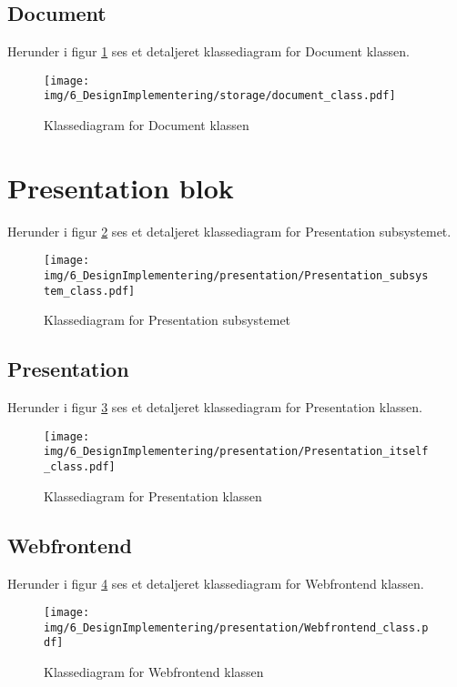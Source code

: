 \begin{appendices}
\pagebreak
\subsection{Document}
Herunder i figur \ref{fig:Document_class} ses et detaljeret klassediagram for Document klassen.
\begin{figure}[H]
	\centering
	\texttt{[image: img/6\_DesignImplementering/storage/document\_class.pdf]}
	\caption{Klassediagram for Document klassen}
	\label{fig:Document_class}
\end{figure}

\pagebreak
\section{Presentation blok}

Herunder i figur \ref{fig:Presentation_block} ses et detaljeret klassediagram for Presentation subsystemet.
\begin{figure}[H]
	\centering
	\texttt{[image: img/6\_DesignImplementering/presentation/Presentation\_subsystem\_class.pdf]}
	\caption{Klassediagram for Presentation subsystemet}
	\label{fig:Presentation_block}
\end{figure}
\pagebreak

\pagebreak
\subsection{Presentation}
Herunder i figur \ref{fig:Presentation_class} ses et detaljeret klassediagram for Presentation klassen.
\begin{figure}[H]
	\centering
	\texttt{[image: img/6\_DesignImplementering/presentation/Presentation\_itself\_class.pdf]}
	\caption{Klassediagram for Presentation klassen}
	\label{fig:Presentation_class}
\end{figure}
\pagebreak


\subsection{Webfrontend}

Herunder i figur \ref{fig:Webfrontend_class} ses et detaljeret klassediagram for Webfrontend klassen.
\begin{figure}[H]
	\centering
	\texttt{[image: img/6\_DesignImplementering/presentation/Webfrontend\_class.pdf]}
	\caption{Klassediagram for Webfrontend klassen}
	\label{fig:Webfrontend_class}
\end{figure}
\pagebreak


\end{appendices}
